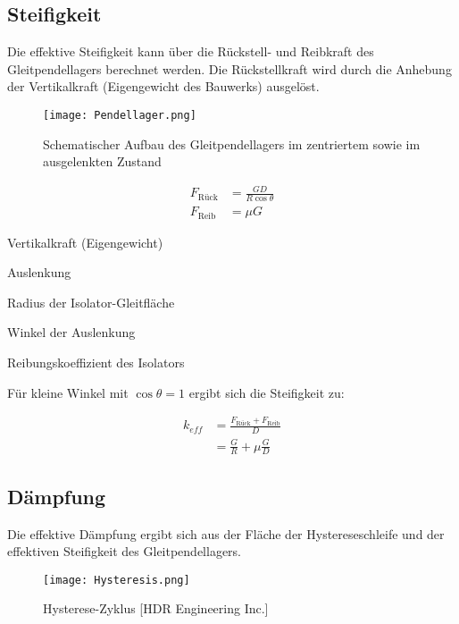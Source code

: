 \subsection{Steifigkeit}
\label{sec:steifigkeit}

Die effektive Steifigkeit kann über die Rückstell- und Reibkraft des Gleitpendellagers berechnet werden. Die Rückstellkraft wird durch die Anhebung der Vertikalkraft (Eigengewicht des Bauwerks) ausgelöst. \cite{Pocanschi}

\begin{figure}[H]
    \centering
    \texttt{[image: Pendellager.png]}
    \caption{Schematischer Aufbau des Gleitpendellagers im zentriertem sowie im ausgelenkten Zustand \cite{Romen}}
\end{figure}

\begin{align*}
F_{\text{Rück}} &= \frac{G D}{R \cos \theta}\\
F_{\text{Reib}} &= \mu G
\end{align*}

  Vertikalkraft (Eigengewicht)\par
{}  Auslenkung\par
{}  Radius der Isolator-Gleitfläche\par
\makebox[0.8cm]{$\theta$}  Winkel der Auslenkung\par
\makebox[0.8cm]{$\mu$}  Reibungskoeffizient des Isolators\par

Für kleine Winkel mit $\cos \theta = 1$ ergibt sich die Steifigkeit zu:

\begin{align}
k_{eff} &= \frac{F_{\text{Rück}} + F_{\text{Reib}}}{D}\nonumber\\
        &= \frac{G}{R} + \mu \frac{G}{D}\label{keff}
\end{align}

\subsection{Dämpfung}
\label{sec:daempdung}

Die effektive Dämpfung ergibt sich aus der Fläche der Hystereseschleife und der effektiven Steifigkeit des Gleitpendellagers. \cite{Huber}\cite{Pocanschi}

\begin{figure}[h]
    \centering
    \texttt{[image: Hysteresis.png]}
    \caption{Hysterese-Zyklus [HDR Engineering Inc.]}
\end{figure}

